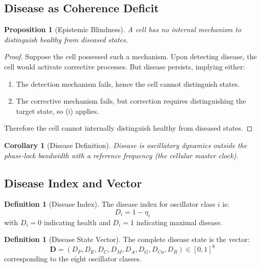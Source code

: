 \documentclass[10pt,twocolumn]{article}
\theoremstyle{plain}
\newtheorem{proposition}[theorem]{Proposition}
\newtheorem{corollary}[theorem]{Corollary}
\theoremstyle{definition}
\newtheorem{definition}[theorem]{Definition}
\theoremstyle{remark}
\newcommand{\Dvec}{\mathbf{D}}
\begin{document}
\subsection{Disease as Coherence Deficit}

\begin{proposition}[Epistemic Blindness]
\label{prop:blindness}
A cell has no internal mechanism to distinguish healthy from diseased states.
\end{proposition}

\begin{proof}
Suppose the cell possessed such a mechanism. Upon detecting disease, the cell would activate corrective processes. But disease persists, implying either:
\begin{enumerate}[label=(\roman*)]
\item The detection mechanism fails, hence the cell cannot distinguish states.
\item The corrective mechanism fails, but correction requires distinguishing the target state, so (i) applies.
\end{enumerate}
Therefore the cell cannot internally distinguish healthy from diseased states.
\end{proof}

\begin{corollary}[Disease Definition]
\label{cor:disease_def}
Disease is oscillatory dynamics outside the phase-lock bandwidth with a reference frequency (the cellular master clock).
\end{corollary}

\subsection{Disease Index and Vector}

\begin{definition}[Disease Index]
\label{def:disease_index}
The disease index for oscillator class $i$ is:
\begin{equation}
D_i = 1 - \eta_i
\label{eq:disease_index}
\end{equation}
with $D_i = 0$ indicating health and $D_i = 1$ indicating maximal disease.
\end{definition}

\begin{definition}[Disease State Vector]
\label{def:disease_vector}
The complete disease state is the vector:
\begin{equation}
\Dvec = (D_P, D_E, D_C, D_M, D_A, D_G, D_{Ca}, D_R) \in [0,1]^8
\label{eq:disease_vector}
\end{equation}
corresponding to the eight oscillator classes.
\end{definition}
\end{document}
